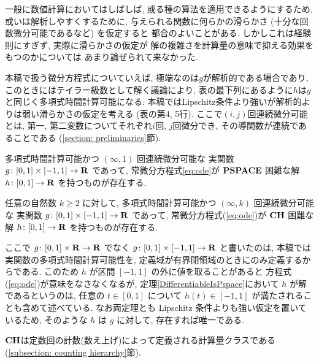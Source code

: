 
一般に数値計算においてはしばしば, 
或る種の算法を適用できるようにするため, 
或いは解析しやすくするために, 
与えられる関数に何らかの滑らかさ (十分な回数微分可能であるなど) を仮定すると
都合のよいことがある. 
しかしこれは経験則にすぎず, 
実際に滑らかさの仮定が
解の複雑さを計算量の意味で抑える効果をもつのかについては
あまり論ぜられて来なかった. 

本稿で扱う微分方程式についていえば, 
極端なのは$g$が解析的である場合であり, 
このときにはテイラー級数として解く議論により, 
表の最下列にあるように$h$は$g$と同じく多項式時間計算可能になる. 
本稿ではLipschitz条件より強いが解析的よりは弱い滑らかさの仮定を考える
(表の第4, 5行). 
ここで$(i, j)$回連続微分可能とは, 
第一, 第二変数についてそれぞれ$i$回, $j$回微分でき, 
その導関数が連続であることである (\ref{section: preliminaries}節).

 \begin{theorem}
  \label{DifferentiableIsPspace}
  多項式時間計算可能かつ $(\infty, 1)$ 回連続微分可能な
  実関数 $g \colon [0,1] \times [-1,1] \to \mathbf R$ であって, 
  常微分方程式\eqref{eq:ode}が
  $\mathbf{PSPACE}$ 困難な解 $h \colon [0, 1] \to \mathbf R$ を持つものが存在する.
 \end{theorem}

 \begin{theorem}
  \label{KTimesIsCH}
  任意の自然数 $k \ge 2$ に対して, 
  多項式時間計算可能かつ $(\infty, k)$ 回連続微分可能な
  実関数 $g \colon [0,1] \times [-1,1] \to \mathbf R$ であって, 
  常微分方程式(\ref{eq:ode})が
  $\mathbf{CH}$ 困難な解 $h \colon [0, 1] \to \mathbf R$ を持つものが存在する.
 \end{theorem}

ここで $g \colon [0,1] \times \mathbf R \to \mathbf R$ でなく
$g \colon [0,1] \times [-1, 1] \to \mathbf R$ と書いたのは, 
本稿では実関数の多項式時間計算可能性を, 
定義域が有界閉領域のときにのみ定義するからである. 
このため $h$ が区間 $[-1, 1]$ の外に値を取ることがあると
方程式(\ref{eq:ode})が意味をなさなくなるが, 
定理\ref{DifferentiableIsPspace}において $h$ が解であるというのは, 
任意の $t \in [0, 1]$ について $h (t) \in [-1, 1]$ が満たされることも含めて述べている.
なお両定理とも Lipschitz 条件よりも強い仮定を置いているため, 
そのような $h$ は $g$ に対して, 存在すれば唯一である. 

$\mathbf{CH}$は定数回の計数(数え上げ)によって定義される計算量クラスである
(\ref{subsection: counting hierarchy}節).

